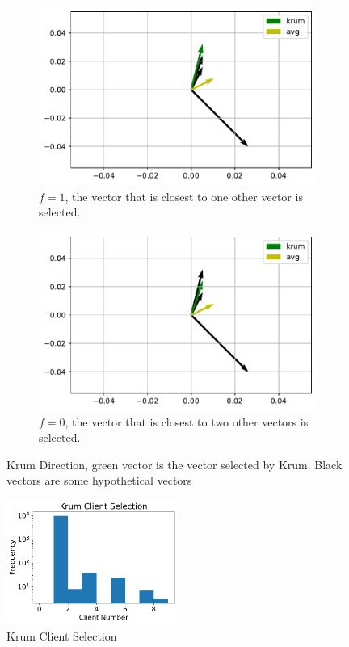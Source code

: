 \documentclass[11pt]{article}
\newcommand{\twocolfigwidth}{0.49\textwidth}
\begin{document}
\begin{figure}[ht]
    \begin{subfigure}[b]{\twocolfigwidth}
        \includegraphics[width=\textwidth]{figs/krum-single}
        \caption{$f=1$, the vector that is closest to one other
        vector is selected.}
    \end{subfigure}
    \begin{subfigure}[b]{\twocolfigwidth}
        \includegraphics[width=\textwidth]{figs/krum-wadv}
        \caption{$f=0$, the vector that is closest to two other
        vectors is selected.}
    \end{subfigure}
    \centering
    \caption{Krum Direction, green vector is the vector selected by Krum. Black
    vectors are some hypothetical vectors}
    \label{fig:krum-dir}

\end{figure}

\begin{figure}[ht]
    \centering
    \includegraphics[width=0.5\textwidth]{figs/krum-selection}
    \caption{Krum Client Selection}
    \label{fig:krum-select}
\end{figure}
\printbibliography
\end{document}
